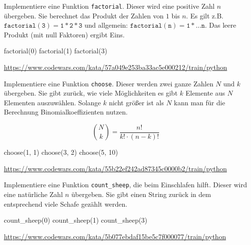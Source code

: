 \documentclass[class=scrartcl, crop=false]{standalone}
\begin{document}
\begin{aufgabe} \noindent
Implementiere eine Funktion \texttt{factorial}. Dieser wird eine positive Zahl $n$ übergeben. Sie berechnet das Produkt der Zahlen von $1$ bis $n$. Es gilt z.B. $ \mathtt{factorial} (\mathtt{3}) = \mathtt{1} * \mathtt{2} *  \mathtt{3}$ und allgemein: $ \mathtt{factorial} (\mathtt{n}) =  \mathtt{1} * \dots \mathtt{n}$.
Das leere Produkt (mit null Faktoren) ergibt Eins.

\begin{pyconsole}
factorial(0)
factorial(1)
factorial(3)
\end{pyconsole}

\noindent\url{https://www.codewars.com/kata/57a049e253ba33ac5e000212/train/python}

\end{aufgabe}

\begin{aufgabe} \noindent
Implementiere eine Funktion \texttt{choose}. Dieser werden zwei ganze Zahlen $N$ und $k$ übergeben. 
Sie gibt zurück, wie viele Möglichkeiten es gibt $k$ Elemente  aus $N$ Elementen auszuwählen. 
Solange $k$ nicht größer ist als $N$ kann man für die Berechnung Binomialkoeffizienten nutzen.

$$\binom{N}{k} = \frac{n!}{k! \cdot (n - k)!}$$

\begin{pyconsole}
choose(1, 1)
choose(3, 2)
choose(5, 10)
\end{pyconsole}

\noindent\url{https://www.codewars.com/kata/55b22ef242ad87345c0000b2/train/python}

\end{aufgabe}


\begin{aufgabe} \noindent
Implementiere eine Funktion \texttt{count_sheep}, die beim Einschlafen hilft. Dieser wird eine natürliche Zahl $n$ übergeben. Sie gibt einen String zurück in dem entsprechend viele Schafe gezählt werden.

\begin{pyconsole}
count_sheep(0)
count_sheep(1)
count_sheep(3)
\end{pyconsole}

\noindent\url{https://www.codewars.com/kata/5b077ebdaf15be5c7f000077/train/python}

\end{aufgabe}
\end{document}

